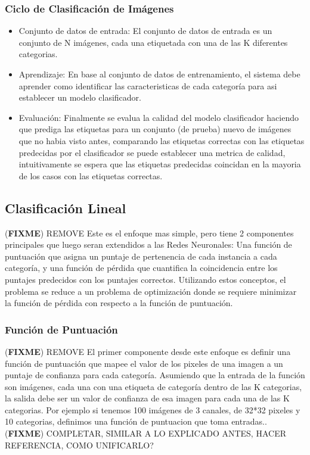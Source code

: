 \documentclass[a4paper,11pt,spanish]{book}
\newcommand*{\FIXME}[1]{{(\textbf{FIXME}) {#1}}}
\begin{document}
	\subsubsection {Ciclo de Clasificación de Imágenes}
	  \begin{itemize}
	    \item Conjunto de datos de entrada: El conjunto de datos de entrada es un conjunto de N imágenes, cada una etiquetada con una de las K diferentes categorias.
	    \item Aprendizaje: En base al conjunto de datos de entrenamiento, el sistema debe aprender como identificar las caracteristicas de cada categoría para asi establecer un modelo clasificador.
	    \item Evaluación: Finalmente se evalua la calidad del modelo clasificador haciendo que prediga las etiquetas para un conjunto (de prueba) nuevo de imágenes que no habia visto antes, comparando las
	    etiquetas correctas con las etiquetas predecidas por el clasificador se puede establecer una metrica de calidad, intuitivamente se espera que las etiquetas predecidas coincidan en la mayoria
	    de los casos con las etiquetas correctas.
	  \end{itemize}

    \subsection{Clasificación Lineal}\FIXME{REMOVE}
      Este es el enfoque mas simple, pero tiene 2 componentes principales que luego seran extendidos a las Redes Neuronales: Una función de puntuación que asigna un puntaje de pertenencia de cada instancia a cada categoría,
      y una función de pérdida que cuantifica la coincidencia entre los puntajes predecidos con los puntajes correctos.
      Utilizando estos conceptos, el problema se reduce a un problema de optimización donde se requiere minimizar la función de pérdida con respecto a la función de puntuación.

      \subsubsection{Función de Puntuación}\FIXME{REMOVE}
	El primer componente desde este enfoque es definir una función de  puntuación que mapee el valor de los pixeles de una imagen a un puntaje de confianza para cada categoría.
	Asumiendo que la entrada de la función son imágenes, cada una con una etiqueta de categoría dentro de las K categorias, la salida debe ser un valor de confianza de esa imagen
	para cada una de las K categorias.
	Por ejemplo si tenemos 100 imágenes de 3 canales, de 32*32 pixeles y 10 categorias, definimos una función de puntuacion que toma entradas..
	\FIXME{COMPLETAR, SIMILAR A LO EXPLICADO ANTES, HACER REFERENCIA, COMO UNIFICARLO?}
\end{document}
